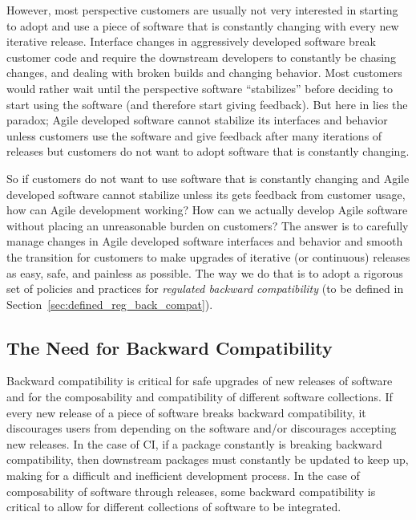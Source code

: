 \documentclass[11pt]{SANDreport}
\begin{document}
However, most perspective customers are usually not very interested in
starting to adopt and use a piece of software that is constantly
changing with every new iterative release.  Interface changes in
aggressively developed software break customer code and require the
downstream developers to constantly be chasing changes, and dealing
with broken builds and changing behavior.  Most customers would rather
wait until the perspective software ``stabilizes'' before deciding to
start using the software (and therefore start giving feedback).  But
here in lies the paradox; Agile developed software cannot stabilize
its interfaces and behavior unless customers use the software and give
feedback after many iterations of releases but customers do not want
to adopt software that is constantly changing.

So if customers do not want to use software that is constantly
changing and Agile developed software cannot stabilize unless its gets
feedback from customer usage, how can Agile development working?  How
can we actually develop Agile software without placing an unreasonable
burden on customers?  The answer is to carefully manage changes in
Agile developed software interfaces and behavior and smooth the
transition for customers to make upgrades of iterative (or continuous)
releases as easy, safe, and painless as possible.  The way we do that
is to adopt a rigorous set of policies and practices for
{}\textit{regulated backward compatibility} (to be defined in
Section~\ref{sec:defined_reg_back_compat}).


%
{}\subsection{The Need for Backward Compatibility}
\label{sec:need_for_back_compat}
%

Backward compatibility is critical for safe upgrades of new releases
of software and for the composability and compatibility of different
software collections.  If every new release of a piece of software
breaks backward compatibility, it discourages users from depending on
the software and/or discourages accepting new releases.  In the case
of CI, if a package constantly is breaking backward compatibility, then
downstream packages must constantly be updated to keep up, making for
a difficult and inefficient development process.  In the case of
composability of software through releases, some backward
compatibility is critical to allow for different collections of
software to be integrated.
\end{document}
